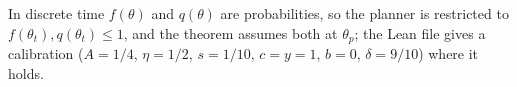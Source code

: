 \begin{remark}
In discrete time $f(\theta)$ and $q(\theta)$ are probabilities, so the planner is restricted to
$f(\theta_t), q(\theta_t) \le 1$, and the theorem assumes both at $\theta_p$; the Lean file gives a calibration ($A = 1/4$, $\eta = 1/2$, $s = 1/10$,
$c = y = 1$, $b = 0$, $\delta = 9/10$) where it holds.
\end{remark}
